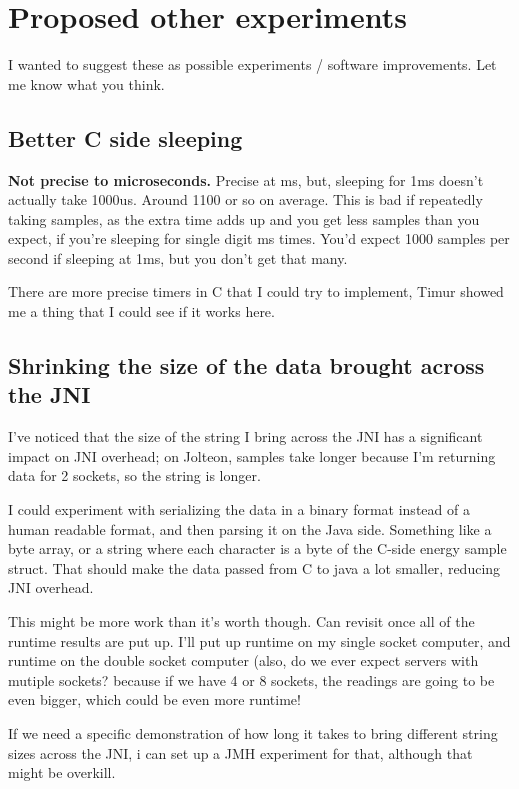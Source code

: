 \section{Proposed other experiments}
    I wanted to suggest these as possible experiments / software improvements. Let me know what you think.

    \subsection{Better C side sleeping}
        \textbf{Not precise to microseconds.} Precise at ms, but, sleeping for 1ms doesn't actually take 1000us. Around 1100 or so on average. This is bad if repeatedly taking samples, as the extra time adds up and you get less samples than you expect, if you're sleeping for single digit ms times. You'd expect 1000 samples per second if sleeping at 1ms, but you don't get that many.
        
        There are more precise timers in C that I could try to implement, Timur showed me a thing that I could see if it works here.
        
    \subsection{Shrinking the size of the data brought across the JNI}
        I've noticed that the size of the string I bring across the JNI has a significant impact on JNI overhead; on Jolteon, samples take longer because I'm returning data for 2 sockets, so the string is longer.
        
        I could experiment with serializing the data in a binary format instead of a human readable format, and then parsing it on the Java side. Something like a byte array, or a string where each character is a byte of the C-side energy sample struct. That should make the data passed from C to java a lot smaller, reducing JNI overhead.
        
        This might be more work than it's worth though. Can revisit once all of the runtime results are put up. I'll put up runtime on my single socket computer, and runtime on the double socket computer (also, do we ever expect servers with mutiple sockets? because if we have 4 or 8 sockets, the readings are going to be even bigger, which could be even more runtime!
        
        If we need a specific demonstration of how long it takes to bring different string sizes across the JNI, i can set up a JMH experiment for that, although that might be overkill.
